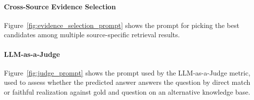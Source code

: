\vspace{-0.1in}
\paragraph{Cross-Source Evidence Selection}
Figure~\ref{fig:evidence_selection_prompt} shows the prompt for picking the best candidates among multiple source-specific retrieval results.

\vspace{-0.1in}
\paragraph{LLM-as-a-Judge}
Figure~\ref{fig:judge_prompt} shows the prompt used by the LLM-as-a-Judge metric, used to assess whether the predicted answer answers the question by direct match or faithful realization against gold and question on an alternative knowledge base.



\clearpage










